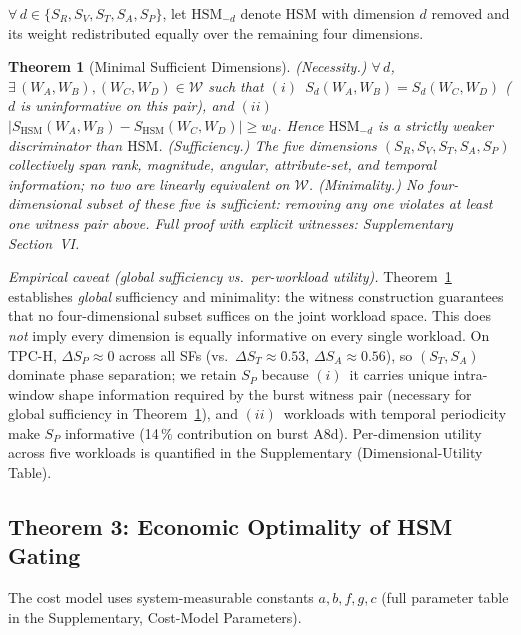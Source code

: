 \documentclass[10pt,journal,compsoc]{IEEEtran}
\newtheorem{theorem}{Theorem}
\newcommand{\SHSM}{S_{\mathrm{HSM}}}
\newcommand{\SR}{S_{R}}
\newcommand{\SV}{S_{V}}
\newcommand{\ST}{S_{T}}
\newcommand{\SA}{S_{A}}
\newcommand{\SPER}{S_{P}}
\begin{document}
$\forall\,d\!\in\!\{\SR,\SV,\ST,\SA,\SPER\}$, let $\mathrm{HSM}_{-d}$
denote HSM with dimension $d$ removed and its weight redistributed
equally over the remaining four dimensions.

\begin{theorem}[Minimal Sufficient Dimensions]\label{thm:minimal}
\emph{(Necessity.)} $\forall\,d$, $\exists\,(W_A,W_B),(W_C,W_D)\!\in\!\mathcal{W}$
such that $(i)$~$S_{d}(W_A,W_B)\!=\!S_{d}(W_C,W_D)$ ($d$ is
uninformative on this pair), and
$(ii)$~$|\SHSM(W_A,W_B)-\SHSM(W_C,W_D)|\geq w_{d}$. Hence
$\mathrm{HSM}_{-d}$ is a strictly weaker discriminator than $\mathrm{HSM}$.
\emph{(Sufficiency.)} The five dimensions $(\SR,\SV,\ST,\SA,\SPER)$
collectively span rank, magnitude, angular, attribute-set, and temporal
information; no two are linearly equivalent on $\mathcal{W}$.
\emph{(Minimality.)} No four-dimensional subset of these five is
sufficient: removing any one violates at least one witness pair above.
Full proof with explicit witnesses: Supplementary Section~VI.
\end{theorem}

\noindent\textit{Empirical caveat (global sufficiency vs.\ per-workload utility).}
Theorem~\ref{thm:minimal} establishes \emph{global} sufficiency and
minimality: the witness construction guarantees that no four-dimensional
subset suffices on the joint workload space. This does \emph{not}
imply every dimension is equally informative on every single workload.
On TPC-H, $\Delta\SPER\!\approx\!0$ across all SFs
(vs.\ $\Delta\ST\!\approx\!0.53$, $\Delta\SA\!\approx\!0.56$), so
$(\ST,\SA)$ dominate phase separation; we retain $\SPER$ because
$(i)$~it carries unique intra-window shape information required by
the burst witness pair (necessary for global sufficiency in
Theorem~\ref{thm:minimal}), and $(ii)$~workloads with temporal
periodicity make $\SPER$ informative (14\,\% contribution on burst
A8d). Per-dimension utility across five workloads is quantified in
the Supplementary (Dimensional-Utility Table).

\subsection{Theorem 3: Economic Optimality of HSM Gating}

The cost model uses system-measurable constants $a,b,f,g,c$
(full parameter table in the Supplementary, Cost-Model Parameters).
\end{document}

